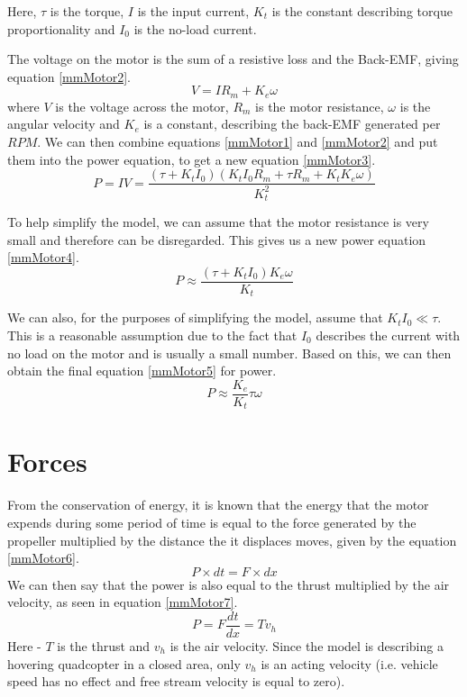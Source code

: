 Here, $\tau$ is the torque, $I$ is the input current, $K_t$ is the constant describing torque proportionality and $I_0$ is the no-load current.

The voltage on the motor is the sum of a resistive loss and the Back-EMF, giving equation \ref{mmMotor2}.
\begin{equation}
\label{mmMotor2}
	V = IR_m + K_e\omega
\end{equation}
where $V$ is the voltage across the motor, $R_m$ is the motor resistance, $\omega$ is the angular velocity and $K_e$ is a constant, describing the back-EMF generated per $RPM$.
We can then combine equations \ref{mmMotor1} and \ref{mmMotor2} and put them into the power equation, to get a new equation \ref{mmMotor3}.
\begin{equation}
\label{mmMotor3}
	P = IV = \frac{(\tau + K_tI_0)(K_tI_0R_m + \tau R_m + K_tK_e\omega)}{K_t^2}
\end{equation}

To help simplify the model, we can assume that the motor resistance is very small and therefore can be disregarded. This gives us a new power equation \ref{mmMotor4}.
\begin{equation}
\label{mmMotor4}
	P \approx \frac{(\tau + K_tI_0)K_e\omega}{K_t}
\end{equation}

We can also, for the purposes of simplifying the model, assume that $K_tI_0\ll \tau$. This is a reasonable assumption due to the fact that $I_0$ describes the current with no load on the motor and is usually a small number. Based on this, we can then obtain the final equation \ref{mmMotor5} for power.
\begin{equation}
\label{mmMotor5}
	P \approx \frac{K_e}{K_t}\tau \omega
\end{equation}

\section{Forces}

From the conservation of energy, it is known that the energy that the motor expends during some period of time is equal to the force generated by the propeller multiplied by the distance the it displaces moves, given by the equation \ref{mmMotor6}.
\begin{equation}
\label{mmMotor6}
	P\times dt = F\times dx
\end{equation}
We can then say that the power is also equal to the thrust multiplied by the air velocity, as seen in equation \ref{mmMotor7}.
\begin{equation}
\label{mmMotor7}
	P = F\frac{dt}{dx} = Tv_h
\end{equation}
Here - $T$ is the thrust and $v_h$ is the air velocity. Since the model is describing a hovering quadcopter in a closed area, only $v_h$ is an acting velocity (i.e. vehicle speed has no effect and free stream velocity is equal to zero).

